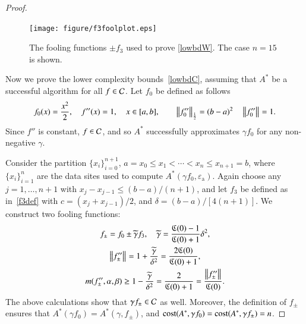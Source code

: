 \documentclass[review]{elsarticle}
\newcommand{\abstol}{\varepsilon_{\textrm{a}}}
\theoremstyle{definition}
\newcommand{\tgamma}{\widetilde{\gamma}}
\begin{document}
\begin{proof}
\begin{figure}
	\centering
	\texttt{[image: figure/f3foolplot.eps]}
	\caption{The fooling functions $\pm f_3$ used to prove \eqref{lowbdW}.  The case $n=15$ is shown.  \label{f3foolplot}}
\end{figure}
	
Now we prove the lower complexity bounds~\eqref{lowbdC}, assuming that $A^*$ be a successful algorithm for all $f  \in \mathcal{C}$.  Let $f_0$ be defined as follows
\begin{equation}
\label{assumpfzero}
f_0(x) =\frac{x^2}{2}, \quad f''(x) = 1, \quad x \in [a,b], \qquad \norm[\frac12]{f_0''} = (b -a)^2  \quad \norm{f_0''} = 1.
\end{equation}
Since $f''$ is constant, $f \in \mathcal{C}$, and so $A^*$ successfully approximates $\gamma f_0$ for any non-negative $\gamma$.

Consider the partition $\{x_i\}_{i=0}^{n+1}$, $a=x_0 \le x_1 < \cdots < x_n \le x_{n+1} = b$, where $\{x_i\}_{i=1}^n$ are the data sites used to compute  $A^*(\gamma f_0,\abstol)$.    Again choose any $j=1, \ldots, n+1$ with $x_j-x_{j-1} \le (b-a)/(n+1)$, and let $f_3$ be defined as in~\eqref{f3def} with $c = (x_j+x_{j-1})/2$, and $\delta  = (b-a)/[4(n+1)]$. We construct two fooling functions:
\begin{gather*}
f_{\pm} = f_0 \pm \tgamma f_3, \quad \tgamma =\frac{\fC(0)-1}{\fC(0)+1}\delta^2, \\
\norm{f''_{\pm}} = 1+\frac{\tgamma}{\delta^2} = \frac{2\fC(0)}{\fC(0)+1} , \\
m(f''_{\pm},\alpha,\beta) \ge 1-\frac{\tgamma}{\delta^2} = \frac{2}{\fC(0)+1} = \frac{\norm{f''_{\pm}} }{\fC(0)}.
\end{gather*}
The above calculations show that $\gamma f_{\pm} \in \mathcal{C}$ as well.  Moreover, the definition of $f_{\pm}$ ensures that
$A^*(\gamma f_0) = A^*(\gamma,f_{\pm})$, and $\operatorname{cost}(A^*,\gamma f_0) = \operatorname{cost}(A^*,\gamma f_{\pm}) = n$.


\end{proof}
\end{document}
